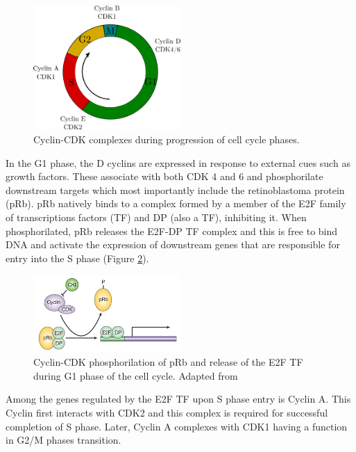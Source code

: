 \documentclass[11pt,twoside,a4paper]{report}
\begin{document}
				\begin{figure}[here]
					\centering
					\includegraphics[width=0.5\textwidth]{pngs/cell_cycle_complex.png}
					\caption[Cyclin-CDK complexes during progression of cell cycle phases]
					{Cyclin-CDK complexes during progression of cell cycle phases.}
					\label{fig:cellcycle_complex}
				\end{figure}
								
				In the G1 phase, the D cyclins are expressed in response to external cues such as growth factors. These associate with both CDK 4 and 6 and phosphorilate downstream targets which most importantly include the retinoblastoma protein (pRb). pRb natively binds to a complex formed by a member of the E2F family of transcriptions factors (TF) and DP (also a TF), inhibiting it. When phosphorilated, pRb releases the E2F-DP TF complex and this is free to bind DNA and activate the expression of downstream genes that are responsible for entry into the S phase (Figure \ref{fig:pRb-E2F}).
				
				\begin{figure}[here]
					\centering
					\includegraphics[width=0.5\textwidth]{pngs/CDK-pRb-E2F-DP.png}
					\caption[Cyclin-CDK phosphorilation of pRb and release of the E2F TF during G1 phase of the cell cycle]
					{Cyclin-CDK phosphorilation of pRb and release of the E2F TF during G1 phase of the cell cycle. {\footnotesize Adapted from \cite{Frisch2002}}}
					\label{fig:pRb-E2F}
				\end{figure}
				
				Among the genes regulated by the E2F TF upon S phase entry is Cyclin A. This Cyclin first interacts with CDK2 and this complex is required for successful completion of S phase. Later, Cyclin A complexes with CDK1 having a function in G2/M phases transition.
				
\end{document}
